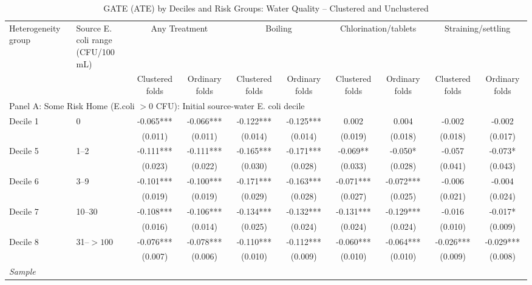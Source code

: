 \begin{landscape}
\begin{table}[p]
\centering
\caption{GATE (ATE) by Deciles and Risk Groups: Water Quality -- Clustered and Unclustered}
\label{tab:table_gate_appendix-ecoli}
\scriptsize\setlength{\tabcolsep}{4pt}
\begin{adjustbox}{max width=\linewidth, center}
\begin{tabular}{llcccccccc}
\toprule
Heterogeneity group & \shortstack{Source E. coli range\\(CFU/100 mL)} & \multicolumn{2}{c}{Any Treatment} & \multicolumn{2}{c}{Boiling} & \multicolumn{2}{c}{Chlorination/tablets} & \multicolumn{2}{c}{Straining/settling} \\
 &  & Clustered folds & Ordinary folds & Clustered folds & Ordinary folds & Clustered folds & Ordinary folds & Clustered folds & Ordinary folds \\
\midrule
\multicolumn{10}{l}{Panel A: Some Risk Home (E.coli $>0$ CFU): Initial source-water E. coli decile} \\
Decile 1 & 0 & -0.065*** & -0.066*** & -0.122*** & -0.125*** & 0.002 & 0.004 & -0.002 & -0.002 \\
 &  & (0.011) & (0.011) & (0.014) & (0.014) & (0.019) & (0.018) & (0.018) & (0.017) \\
Decile 5 & 1--2 & -0.111*** & -0.111*** & -0.165*** & -0.171*** & -0.069** & -0.050* & -0.057 & -0.073* \\
 &  & (0.023) & (0.022) & (0.030) & (0.028) & (0.033) & (0.028) & (0.041) & (0.043) \\
Decile 6 & 3--9 & -0.101*** & -0.100*** & -0.171*** & -0.163*** & -0.071*** & -0.072*** & -0.006 & -0.004 \\
 &  & (0.019) & (0.019) & (0.029) & (0.028) & (0.027) & (0.025) & (0.021) & (0.024) \\
Decile 7 & 10--30 & -0.108*** & -0.106*** & -0.134*** & -0.132*** & -0.131*** & -0.129*** & -0.016 & -0.017* \\
 &  & (0.016) & (0.014) & (0.025) & (0.024) & (0.024) & (0.024) & (0.010) & (0.009) \\
Decile 8 & 31--$>100$ & -0.076*** & -0.078*** & -0.110*** & -0.112*** & -0.060*** & -0.064*** & -0.026*** & -0.029*** \\
 &  & (0.007) & (0.006) & (0.010) & (0.009) & (0.010) & (0.010) & (0.009) & (0.008) \\
\multicolumn{10}{l}{\textit{Sample}} \\

\end{tabular}
\end{adjustbox}
\end{table}
\end{landscape}
